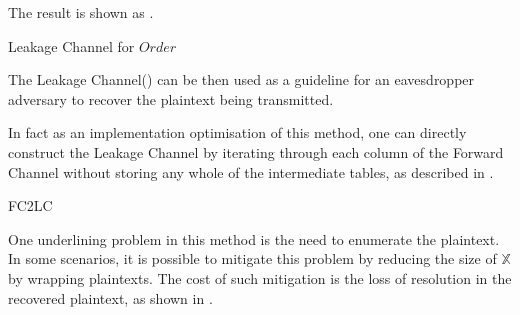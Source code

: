 \begin{example}
The result is shown as .

\begin{table}[H]
\begin{center}
{}
\end{center}
\caption{Leakage Channel for $Order$}
\label{Tbl: Leakage Channel for Order}
\end{table}

The Leakage Channel() can be then used as a guideline for an eavesdropper adversary to recover the plaintext being transmitted.

In fact as an implementation optimisation of this method, one can directly construct the Leakage Channel by iterating through each column of the Forward Channel without storing any whole of the intermediate tables, as described in .

\begin{algorithm}[H]
 \caption{FC2LC} \label{Alg: FC2LC}
\end{algorithm}

\end{example}

One underlining problem in this method is the need to enumerate the plaintext. In some scenarios, it is possible to mitigate this problem by reducing the size of $\mathbb{X}$ by wrapping plaintexts. The cost of such mitigation is the loss of resolution in the recovered plaintext, as shown in .


